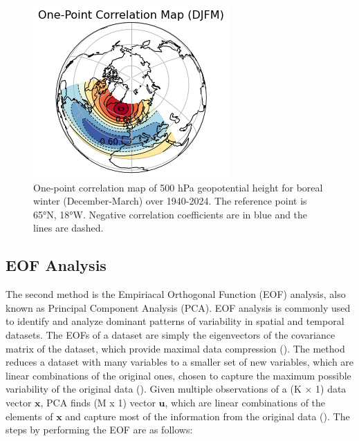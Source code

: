 \documentclass[
]{krantz}
\begin{document}
\begin{figure}

{\centering \includegraphics[width=0.5\linewidth]{work/05_nao/figures/OnePointCorrelation} 

}

\caption{One-point correlation map of 500 hPa geopotential height for boreal winter (December-March) over 1940-2024. The reference point is 65°N, 18°W. Negative correlation coefficients are in blue and the lines are dashed.}\label{fig:CorrelationPamela}
\end{figure}

\subsection{EOF Analysis}\label{eof-analysis}

The second method is the Empiriacal Orthogonal Function (EOF) analysis, also known as Principal Component Analysis (PCA). EOF analysis is commonly used to identify and analyze dominant patterns of variability in spatial and temporal datasets. The EOFs of a dataset are simply the eigenvectors of the covariance matrix of the dataset, which provide maximal data compression (\citet{wilks2011}). The method reduces a dataset with many variables to a smaller set of new variables, which are linear combinations of the original ones, chosen to capture the maximum possible variability of the original data (\citet{wilks2011}). Given multiple observations of a (K × 1) data vector \(\textbf{x}\), PCA finds (M x 1) vector \(\textbf{u}\), which are linear combinations of the elements of \(\textbf{x}\) and capture most of the information from the original data (\citet{wilks2011}). The steps by performing the EOF are as follows:
\end{document}
